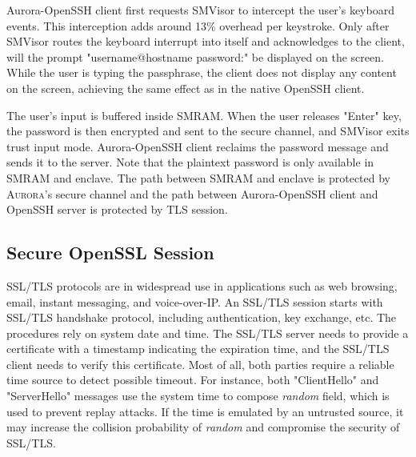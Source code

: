 Aurora-OpenSSH client first requests SMVisor to intercept the user's  keyboard events. This interception adds around 13\% overhead per keystroke. Only after SMVisor routes the keyboard interrupt into itself and acknowledges to the client, will the prompt "username@hostname password:"  be displayed on the screen. While the user is typing the passphrase, the client does not display any content on the screen, achieving the same effect as in the native OpenSSH client.

The user's input is buffered inside SMRAM. When the user releases "Enter" key, the password is then encrypted and sent to the secure channel, and SMVisor exits trust input mode.  Aurora-OpenSSH client reclaims the password message and sends it to the server. Note that the plaintext password is only available in SMRAM and enclave. The path between SMRAM and enclave is protected by \textsc{Aurora}'s secure channel and the path between Aurora-OpenSSH client and OpenSSH server is protected by TLS session.
%

\subsection{Secure OpenSSL Session}\label{openssl}

SSL/TLS protocols are in widespread use in applications such as web browsing, email, instant messaging, and voice-over-IP. 
An SSL/TLS session starts with SSL/TLS handshake protocol, including authentication, key exchange, etc. The procedures rely on system date and time. The SSL/TLS server needs to provide a certificate with a timestamp indicating the expiration time, and the SSL/TLS client needs to verify this certificate. Most of all, both parties require a reliable time source to detect possible timeout. For instance, both "ClientHello" and "ServerHello" messages use the system time to compose \textit{random} field, which is used to prevent replay attacks. If the time is emulated by an untrusted source, it may increase the collision probability of \emph{random} and compromise the security of SSL/TLS.

